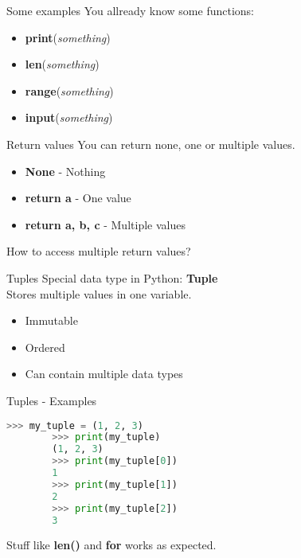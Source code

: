 \documentclass{beamer}
\begin{document}
\begin{frame}{Some examples}
    You allready know some functions:
    \begin{itemize}
        \item<1-> \textbf{print}(\textit{something})
        \item<2-> \textbf{len}(\textit{something})
        \item<3-> \textbf{range}(\textit{something})
        \item<4-> \textbf{input}(\textit{something})
    \end{itemize}
    
\end{frame}

\begin{frame}{Return values}
    You can return none, one or multiple values.\pause
    \begin{itemize}
        \item<2-> \textbf{None} - Nothing
        \item<3-> \textbf{return a} - One value
        \item<4-> \textbf{return a, b, c} - Multiple values
    \end{itemize}\pause
    How to access multiple return values?

\end{frame}

\begin{frame}{Tuples}
    Special data type in Python: \textbf{Tuple}\\ \pause
    Stores multiple values in one variable.\\ \pause
    \begin{itemize}
        \item Immutable
        \item Ordered
        \item Can contain multiple data types
    \end{itemize}
\end{frame}

\begin{frame}[fragile]{Tuples - Examples}
    \begin{lstlisting}[backgroundcolor = \color{lightgray},language=Python]
        >>> my_tuple = (1, 2, 3)
        >>> print(my_tuple)
        (1, 2, 3)
        >>> print(my_tuple[0])
        1
        >>> print(my_tuple[1])
        2
        >>> print(my_tuple[2])
        3
    \end{lstlisting}
    Stuff like \textbf{len()} and \textbf{for} works as expected.
\end{frame}
\end{document}
